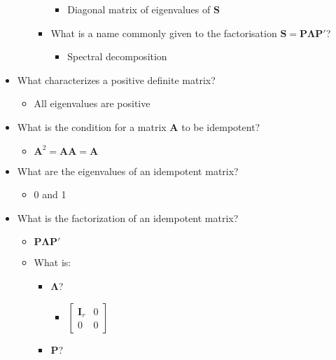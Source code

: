 \documentclass[
  letterpaper,
  DIV=11,
  numbers=noendperiod]{scrartcl}
\providecommand{\tightlist}{%
  \setlength{\itemsep}{0pt}\setlength{\parskip}{0pt}}\usepackage{longtable,booktabs,array}
\begin{document}
\begin{itemize}
\begin{itemize}
\begin{itemize}
      \begin{itemize}
      \tightlist
      \item
        Diagonal matrix of eigenvalues of \(\symbf{S}\)
      \end{itemize}
    \item
      What is a name commonly given to the factorisation
      \(\symbf{S}= \symbf{P}\symbf{\Lambda}\symbf{P}'\)?

      \begin{itemize}
      \tightlist
      \item
        Spectral decomposition
      \end{itemize}
    \end{itemize}
  \end{itemize}
\item
  What characterizes a positive definite matrix?

  \begin{itemize}
  \tightlist
  \item
    All eigenvalues are positive
  \end{itemize}
\item
  What is the condition for a matrix \(\symbf{A}\) to be idempotent?

  \begin{itemize}
  \tightlist
  \item
    \(\symbf{A}^2=\symbf{A}\symbf{A}=\symbf{A}\)
  \end{itemize}
\item
  What are the eigenvalues of an idempotent matrix?

  \begin{itemize}
  \tightlist
  \item
    0 and 1
  \end{itemize}
\item
  What is the factorization of an idempotent matrix?

  \begin{itemize}
  \tightlist
  \item
    \(\symbf{P}\symbf{\Lambda}\symbf{P}'\)
  \item
    What is:

    \begin{itemize}
    \tightlist
    \item
      \(\symbf{\Lambda}\)?

      \begin{itemize}
      \tightlist
      \item
        \(\begin{bmatrix} \symbf{I}_r & 0 \\ 0 & 0 \end{bmatrix}\)
      \end{itemize}
    \item
      \(\symbf{P}\)?


\end{itemize}
\end{itemize}
\end{itemize}
\end{document}
